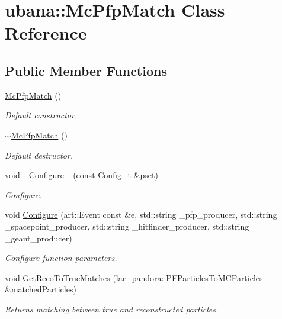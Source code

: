 \hypertarget{classubana_1_1McPfpMatch}{\section{ubana\-:\-:Mc\-Pfp\-Match Class Reference}
\label{classubana_1_1McPfpMatch}
}
\subsection*{Public Member Functions}
\begin{DoxyCompactItemize}
\item 
\hypertarget{classubana_1_1McPfpMatch_aea3e9923fdf8855d5798015b36f2d516}{\hyperlink{classubana_1_1McPfpMatch_aea3e9923fdf8855d5798015b36f2d516}{Mc\-Pfp\-Match} ()}\label{classubana_1_1McPfpMatch_aea3e9923fdf8855d5798015b36f2d516}

\begin{DoxyCompactList}\small\item\em Default constructor. \end{DoxyCompactList}\item 
\hypertarget{classubana_1_1McPfpMatch_a69ebf44a6ee96c7ee4bfab22c13423b1}{\hyperlink{classubana_1_1McPfpMatch_a69ebf44a6ee96c7ee4bfab22c13423b1}{$\sim$\-Mc\-Pfp\-Match} ()}\label{classubana_1_1McPfpMatch_a69ebf44a6ee96c7ee4bfab22c13423b1}

\begin{DoxyCompactList}\small\item\em Default destructor. \end{DoxyCompactList}\item 
\hypertarget{classubana_1_1McPfpMatch_aa6578a20f7a8194fae3caa2b19044e40}{void \hyperlink{classubana_1_1McPfpMatch_aa6578a20f7a8194fae3caa2b19044e40}{\-\_\-\-Configure\-\_\-} (const Config\-\_\-t \&pset)}\label{classubana_1_1McPfpMatch_aa6578a20f7a8194fae3caa2b19044e40}

\begin{DoxyCompactList}\small\item\em Configure. \end{DoxyCompactList}\item 
void \hyperlink{classubana_1_1McPfpMatch_a0f07649a58ade64a2a127846231cd7c8}{Configure} (art\-::\-Event const \&e, std\-::string \-\_\-pfp\-\_\-producer, std\-::string \-\_\-spacepoint\-\_\-producer, std\-::string \-\_\-hitfinder\-\_\-producer, std\-::string \-\_\-geant\-\_\-producer)
\begin{DoxyCompactList}\small\item\em Configure function parameters. \end{DoxyCompactList}\item 
void \hyperlink{classubana_1_1McPfpMatch_a44436a82315246fb67b42f8542fb327c}{Get\-Reco\-To\-True\-Matches} (lar\-\_\-pandora\-::\-P\-F\-Particles\-To\-M\-C\-Particles \&matched\-Particles)
\begin{DoxyCompactList}\small\item\em Returns matching between true and reconstructed particles. \end{DoxyCompactList}\end{DoxyCompactItemize}
